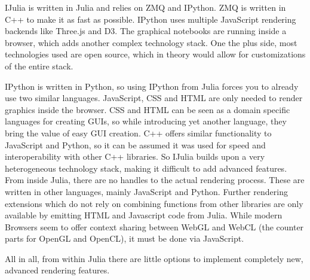 IJulia is written in Julia and relies on ZMQ and IPython.
ZMQ is written in C++ to make it as fast as possible.
IPython uses multiple JavaScript rendering backends like Three.js and D3.
The graphical notebooks are running inside a browser, which adds another complex technology stack.
One the plus side, most technologies used are open source, which in theory would allow for customizations of the entire stack.

IPython is written in Python, so using IPython from Julia forces you to already use two similar languages.
JavaScript, CSS and HTML are only needed to render graphics inside the browser. CSS and HTML can be seen as a domain specific languages for creating \ac{GUI}s, so while introducing yet another language, they bring the value of easy \ac{GUI} creation.
C++ offers similar functionality to JavaScript and Python, so it can be assumed it was used for speed and interoperability with other C++ libraries.
So IJulia builds upon a very heterogeneous technology stack, making it difficult to add advanced features.
From inside Julia, there are no handles to the actual rendering process. These are written in other languages, mainly JavaScript and Python.
Further rendering extensions which do not rely on combining functions from other libraries are only available by emitting HTML and Javascript code from Julia.
While modern Browsers seem to offer context sharing between \ac{WebGL} and \ac{WebCL} (the counter parts for \ac{OpenGL} and \ac{OpenCL}), it must be done via JavaScript.

All in all, from within Julia there are little options to implement completely new, advanced rendering features.



